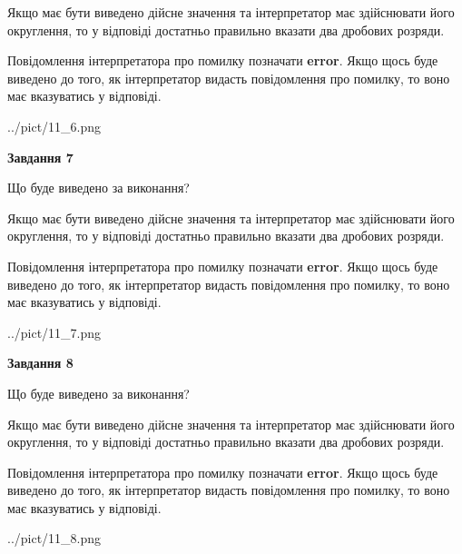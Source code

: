 \documentclass[12pt, ukrainian]{article}
\begin{document}
{\begin {Large}
Якщо має бути виведено дійсне значення та інтерпретатор має здійснювати його округлення, 
то у відповіді достатньо правильно вказати два дробових розряди.

Повідомлення інтерпретатора про помилку позначати \textbf{error}.
Якщо щось буде виведено до того, як інтерпретатор видасть повідомлення про помилку, 
то воно має вказуватись у відповіді. \par

\begin{center}
	{../pict/11_6.png}
\end{center}
\newpage

{\begin {center}\textbf{Завдання 7}\end {center}}\par
Що буде виведено за виконання? \par

Якщо має бути виведено дійсне значення та інтерпретатор має здійснювати його округлення, 
то у відповіді достатньо правильно вказати два дробових розряди.

Повідомлення інтерпретатора про помилку позначати \textbf{error}.
Якщо щось буде виведено до того, як інтерпретатор видасть повідомлення про помилку, 
то воно має вказуватись у відповіді. \par

\begin{center}
	{../pict/11_7.png}
\end{center}
\newpage

{\begin {center}\textbf{Завдання 8}\end {center}}\par
Що буде виведено за виконання? \par

Якщо має бути виведено дійсне значення та інтерпретатор має здійснювати його округлення, 
то у відповіді достатньо правильно вказати два дробових розряди.

Повідомлення інтерпретатора про помилку позначати \textbf{error}.
Якщо щось буде виведено до того, як інтерпретатор видасть повідомлення про помилку, 
то воно має вказуватись у відповіді. \par

\begin{center}
	{../pict/11_8.png}
\end{center}
\newpage


\end{Large}}
\end{document}

